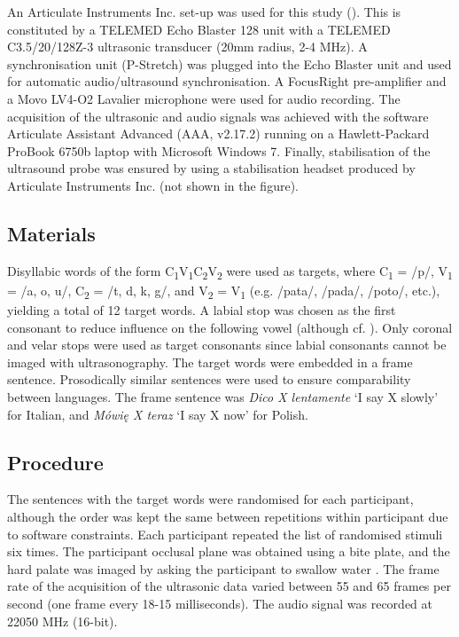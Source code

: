\documentclass[authoryear, twocolumn]{elsarticle}
\begin{document}
An Articulate Instruments Inc. set-up was used for this study
(). This is constituted by a TELEMED Echo Blaster 128
unit with a TELEMED C3.5/20/128Z-3 ultrasonic transducer (20mm radius,
2-4 MHz). A synchronisation unit (P-Stretch) was plugged into the Echo
Blaster unit and used for automatic audio/ultrasound synchronisation. A
FocusRight pre-amplifier and a Movo LV4-O2 Lavalier microphone were used
for audio recording. The acquisition of the ultrasonic and audio signals
was achieved with the software Articulate Assistant Advanced (AAA,
v2.17.2) running on a Hawlett-Packard ProBook 6750b laptop with
Microsoft Windows 7. Finally, stabilisation of the ultrasound probe was
ensured by using a stabilisation headset produced by Articulate
Instruments Inc. (not shown in the figure).

\subsection{Materials}\label{materials}

Disyllabic words of the form
C\textsubscript{1}V\textsubscript{1}C\textsubscript{2}V\textsubscript{2}
were used as targets, where C\textsubscript{1} = /p/, V\textsubscript{1}
= /a, o, u/, C\textsubscript{2} = /t, d, k, g/, and V\textsubscript{2} =
V\textsubscript{1} (e.g. /pata/, /pada/, /poto/, etc.), yielding a total
of 12 target words. A labial stop was chosen as the first consonant to
reduce influence on the following vowel (although cf.
\citet{vazquez-alvarez2007}). Only coronal and velar stops were used as
target consonants since labial consonants cannot be imaged with
ultrasonography. The target words were embedded in a frame sentence.
Prosodically similar sentences were used to ensure comparability between
languages. The frame sentence was \emph{Dico X lentamente} `I say X
slowly' for Italian, and \emph{Mówię X teraz} `I say X now' for Polish.

\subsection{Procedure}\label{procedure}

The sentences with the target words were randomised for each
participant, although the order was kept the same between repetitions
within participant due to software constraints. Each participant
repeated the list of randomised stimuli six times. The participant
occlusal plane was obtained using a bite plate, and the hard palate was
imaged by asking the participant to swallow water \citep{scobbie2011}.
The frame rate of the acquisition of the ultrasonic data varied between
55 and 65 frames per second (one frame every 18-15 milliseconds). The
audio signal was recorded at 22050 MHz (16-bit).
\end{document}
